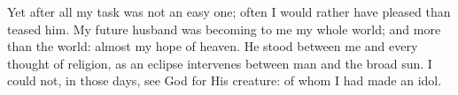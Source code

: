 Yet after all my task was not an easy one; often I would rather have
pleased than teased him.  My future husband was becoming to me my whole
world; and more than the world: almost my hope of heaven.  He stood
between me and every thought of religion, as an eclipse intervenes
between man and the broad sun.  I could not, in those days, see God for
His creature: of whom I had made an idol.
